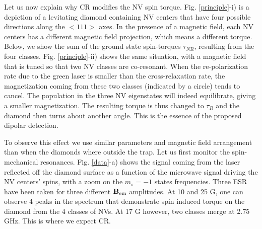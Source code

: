 \documentclass[preprintnumbers,amsmath,amssymb,superscriptaddress,twocolumn,showpacs]{revtex4-1}
\begin{document}
Let us now explain why CR modifies the NV spin torque.
Fig. \ref{principle}-i) is a depiction of a levitating diamond containing NV centers that have four possible directions along the $<111>$ axes. 
In the presence of a magnetic field, each NV centers has a different magnetic field projection, which means a different torque. 
Below, we show the sum of the ground state spin-torques $\tau_{NR}$, resulting from the four classes. 
Fig. \ref{principle}-ii) shows the same situation, with a magnetic field that is tuned so that two NV classes are co-resonant. 
When the re-polarization rate due to the green laser is smaller than the cross-relaxation rate, the magnetization coming from these two classes (indicated by a circle) tends to cancel. The population in the three NV eigenstates will indeed equilibrate, giving a smaller magnetization.
The resulting torque is thus changed to $\tau_{R}$ and the diamond then turns about another angle.
This is the essence of the proposed dipolar detection. 


To observe this effect we use similar parameters and magnetic field arrangement than when the diamonds where outside the trap.
Let us first monitor the spin-mechanical resonances. 
Fig. \ref{data}-a) shows the signal coming from the laser reflected off the diamond surface as a function of the microwave signal driving the NV centers' spins, with a zoom on the $m_s=-1$ states frequencies.
Three ESR have been taken for three different $\bf B_{\rm em}$ amplitudes. 
At 10 and 25 G, one can observe 4 peaks in the spectrum that demonstrate spin induced torque on the diamond from the 4 classes of NVs.
At 17 G however, two classes merge at 2.75 GHz. This is where we expect CR.
\end{document}

